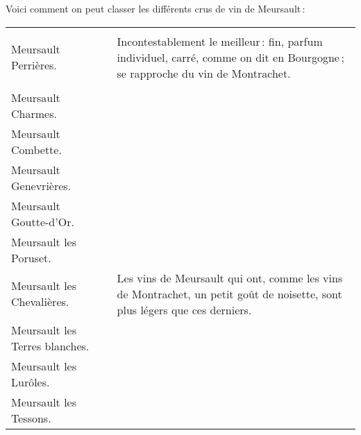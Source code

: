 Voici comment on peut classer les différents crus de vin de Meursault :

\scriptsize
\begin{longtable}{m{12em}m{9em}m{13em}}                                                    
                                   &                     &                                                             \\
 Meursault Perrières.              &                     &  Incontestablement le meilleur : fin, parfum 
                                                            individuel, carré, comme on dit en Bourgogne ; 
                                                            se rapproche du vin de Montrachet.                         \\
                                                                                                                       \\
  Meursault Charmes.               &                     &                                                             \\
  Meursault Combette.              &                     &                                                             \\
  Meursault Genevrières.           &                     &                                                             \\
  Meursault Goutte-d'Or.           &                     &                                                             \\
  Meursault les Poruset.           &                     &                                                             \\
  Meursault les Chevalières.       &                     & Les vins de Meursault qui ont, comme 
                                                           les vins de Montrachet, un petit goût 
                                                           de noisette, sont plus légers que ces 
                                                           derniers.                                                   \\
  Meursault les Terres blanches.   &                     &                                                             \\
  Meursault les Lurôles.           &                     &                                                             \\
  Meursault les Tessons.           &                     &                                                             \\

\end{longtable}
